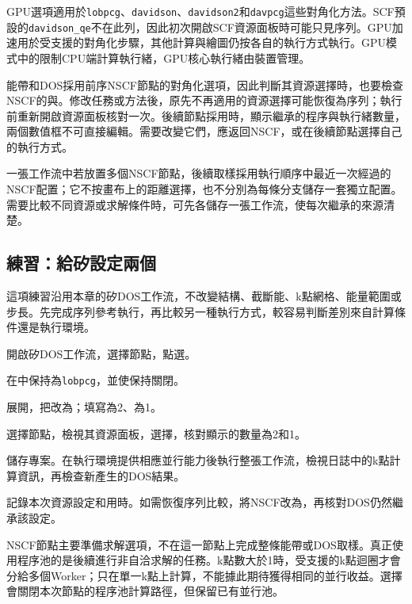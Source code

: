 GPU選項適用於\texttt{lobpcg}、\texttt{davidson}、\texttt{davidson2}和\texttt{davpcg}這些對角化方法。SCF預設的\texttt{davidson\_qe}不在此列，因此初次開啟SCF資源面板時可能只見序列。GPU加速用於受支援的對角化步驟，其他計算與繪圖仍按各自的執行方式執行。GPU模式中的限制CPU端計算執行緒，GPU核心執行緒由裝置管理。

能帶和DOS採用前序NSCF節點的對角化選項，因此判斷其資源選擇時，也要檢查NSCF的與。修改任務或方法後，原先不再適用的資源選擇可能恢復為序列；執行前重新開啟資源面板核對一次。後續節點採用時，顯示繼承的程序與執行緒數量，兩個數值框不可直接編輯。需要改變它們，應返回NSCF，或在後續節點選擇自己的執行方式。

一張工作流中若放置多個NSCF節點，後續取樣採用執行順序中最近一次經過的NSCF配置；它不按畫布上的距離選擇，也不分別為每條分支儲存一套獨立配置。需要比較不同資源或求解條件時，可先各儲存一張工作流，使每次繼承的來源清楚。

\subsection{練習：給矽設定兩個}

這項練習沿用本章的矽DOS工作流，不改變結構、截斷能、k點網格、能量範圍或步長。先完成序列參考執行，再比較另一種執行方式，較容易判斷差別來自計算條件還是執行環境。

\begin{steps}
\item 開啟矽DOS工作流，選擇節點，點選。
\item 在中保持為\texttt{lobpcg}，並使保持關閉。
\item 展開，把改為；填寫為2、為1。
\item 選擇節點，檢視其資源面板，選擇，核對顯示的數量為2和1。
\item 儲存專案。在執行環境提供相應並行能力後執行整張工作流，檢視日誌中的k點計算資訊，再檢查新產生的DOS結果。
\item 記錄本次資源設定和用時。如需恢復序列比較，將NSCF改為，再核對DOS仍然繼承該設定。
\end{steps}

NSCF節點主要準備求解選項，不在這一節點上完成整條能帶或DOS取樣。真正使用程序池的是後續進行非自洽求解的任務。k點數大於1時，受支援的k點迴圈才會分給多個Worker；只在單一k點上計算，不能據此期待獲得相同的並行收益。選擇會關閉本次節點的程序池計算路徑，但保留已有並行池。

